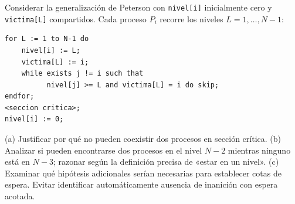 \begin{ejercicio}
Considerar la generalización de Peterson con \texttt{nivel[i]} inicialmente cero y \texttt{victima[L]}
compartidos. Cada proceso $P_i$ recorre los niveles $L = 1, \dots, N-1$:
\begin{lstlisting}
for L := 1 to N-1 do
    nivel[i] := L;
    victima[L] := i;
    while exists j != i such that
          nivel[j] >= L and victima[L] = i do skip;
endfor;
<seccion critica>;
nivel[i] := 0;
\end{lstlisting}
(a) Justificar por qué no pueden coexistir dos procesos en sección crítica. (b) Analizar si pueden encontrarse dos
procesos en el nivel $N-2$ mientras ninguno está en $N-3$; razonar según la definición precisa de «estar en un
nivel». (c) Examinar qué hipótesis adicionales serían necesarias para establecer cotas de espera. Evitar
identificar automáticamente ausencia de inanición con espera acotada.
\end{ejercicio}
